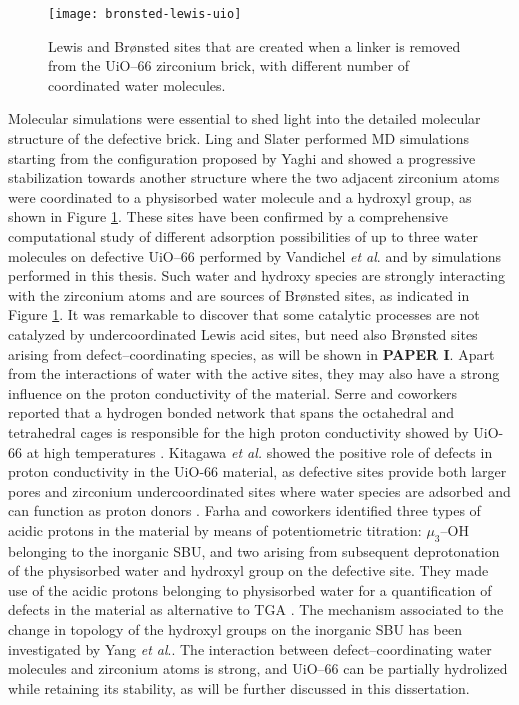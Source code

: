 \begin{figure}[!bhtp]
	\centering
 	\texttt{[image: bronsted-lewis-uio]}
	\caption{Lewis and Br\o{}nsted sites that are created when a linker is removed from the UiO--66 zirconium brick, with different number of coordinated water molecules.}
	\label{fig:bronsted-lewis-uio}
\end{figure}
\npar
Molecular simulations were essential to shed light into the detailed molecular structure of the defective brick. Ling and Slater \cite{ling2016dynamic} performed MD simulations starting from the configuration proposed by Yaghi and showed a progressive stabilization towards another structure where the two adjacent zirconium atoms were coordinated to a physisorbed water molecule and a hydroxyl group, as shown in Figure \ref{fig:bronsted-lewis-uio}. These sites have been confirmed by a comprehensive computational study of different adsorption possibilities of up to three water molecules on defective UiO--66 performed by Vandichel \textit{et al}. \cite{vandichel2016water} and by simulations performed in this thesis.
Such water and hydroxy species are strongly interacting with the zirconium atoms and are sources of Br\o{}nsted sites, as indicated in Figure \ref{fig:bronsted-lewis-uio}. It was remarkable to discover that some catalytic processes are not catalyzed by undercoordinated Lewis acid sites, but need also Br\o{}nsted sites arising from defect--coordinating species, as will be shown in \textbf{PAPER I}. Apart from the interactions of water with the active sites, they may also have a strong influence on the proton conductivity of the material. Serre and coworkers reported that a hydrogen bonded network that spans the octahedral and tetrahedral cages is responsible for the high proton conductivity showed by UiO-66 at high temperatures \cite{borges2016proton}. Kitagawa \textit{et al.} showed the positive role of defects in proton conductivity in the UiO-66 material, as defective sites provide both larger pores and zirconium undercoordinated sites where water species are adsorbed and can function as proton donors \cite{taylor2015defect}. Farha and coworkers identified three types of acidic protons in the material by means of potentiometric titration: $\mu_{3}$--OH belonging to the inorganic SBU, and two arising from subsequent deprotonation of the physisorbed water and hydroxyl group on the defective site. They made use of the acidic protons belonging to physisorbed water for a quantification of defects in the material as alternative to TGA \cite{klet2016evaluation}. The mechanism associated to the change in topology of the hydroxyl groups on the inorganic SBU has been investigated by Yang \textit{et al}.\cite{yang2016tuning}. The interaction between defect--coordinating water molecules and zirconium atoms is strong, and UiO--66 can be partially hydrolized\cite{decoste2013stability} while retaining its stability, as will be further discussed in this dissertation.
